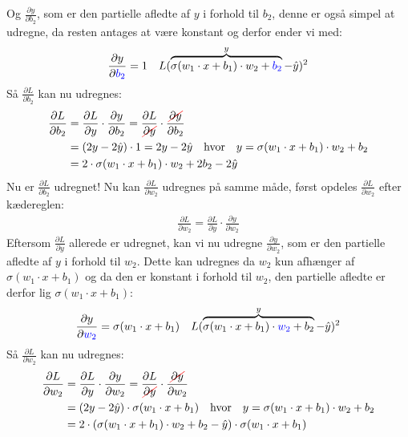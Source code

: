 \documentclass{article}
\newcommand\Ccancel[2][black]{
    \let\OldcancelColor\CancelColor
    \renewcommand\CancelColor{\color{#1}}
    \cancel{#2}
    \renewcommand\CancelColor{\OldcancelColor}
}
\begin{document}
Og $\frac{\partial y}{\partial b_2}$, som er den partielle afledte af $y$ i forhold til $b_2$, denne er også simpel at udregne, da resten antages at være konstant og derfor ender vi med:
\begin{align}
  \frac{\partial y}{\partial {\color{blue}b_2}} = 1 && L(\overbrace{\sigma(w_1 \cdot x + b_1) \cdot w_2 + {\color{blue}b_2} }^{y}  - \hat{y})^2
\end{align}
Så $\frac{\partial L}{\partial b_2}$ kan nu udregnes:
\begin{align}
  \frac{\partial L}{\partial b_2} &= \frac{\partial L}{\partial y} \cdot \frac{\partial y}{\partial b_2} = \frac{\partial L}{\Ccancel[red]{\partial y}} \cdot \frac{\Ccancel[red]{\partial y}}{\partial b_2}\\
  &= (2y - 2\hat{y}) \cdot 1 = 2y - 2\hat{y} \quad\text{hvor}\quad y = \sigma(w_1 \cdot x + b_1) \cdot w_2 + b_2\\
  &= 2\cdot\sigma(w_1 \cdot x + b_1) \cdot w_2 + 2b_2 - 2\hat{y}
\end{align}
Nu er $\frac{\partial L}{\partial b_2}$ udregnet! Nu kan $\frac{\partial L}{\partial w_2}$ udregnes på samme måde, først opdeles $\frac{\partial L}{\partial w_2}$ efter kædereglen:
\begin{align}
  \frac{\partial L}{\partial w_2} = \frac{\partial L}{\partial y} \cdot \frac{\partial y}{\partial w_2}
\end{align}
Eftersom $\frac{\partial L}{\partial y}$ allerede er udregnet, kan vi nu udregne $\frac{\partial y}{\partial w_2}$, som er den partielle afledte af $y$ i forhold til $w_2$. Dette kan udregnes da $w_2$ kun afhænger af $\sigma(w_1 \cdot x + b_1)$ og da den er konstant i forhold til $w_2$, den partielle afledte er derfor lig $\sigma(w_1 \cdot x + b_1)$:
\begin{align}
  \frac{\partial y}{\partial {\color{blue}w_2}} = \sigma(w_1 \cdot x + b_1) && L(\overbrace{\sigma(w_1 \cdot x + b_1) \cdot {\color{blue}w_2} + b_2}^{y}  - \hat{y})^2
\end{align}
Så $\frac{\partial L}{\partial w_2}$ kan nu udregnes:
\begin{align}
  \frac{\partial L}{\partial w_2} &= \frac{\partial L}{\partial y} \cdot \frac{\partial y}{\partial w_2} = \frac{\partial L}{\Ccancel[red]{\partial y}} \cdot \frac{\Ccancel[red]{\partial y}}{\partial w_2}\\
  &= (2y - 2\hat{y}) \cdot \sigma(w_1 \cdot x + b_1) \quad\text{hvor}\quad y = \sigma(w_1 \cdot x + b_1) \cdot w_2 + b_2\\
  &= 2\cdot(\sigma(w_1 \cdot x + b_1) \cdot w_2 + b_2 - \hat{y}) \cdot \sigma(w_1 \cdot x + b_1)
\end{align}
\end{document}
